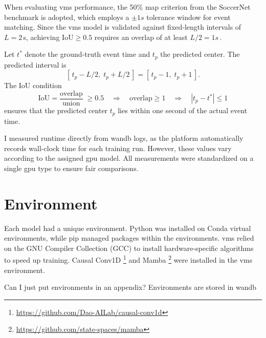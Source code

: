 When evaluating \acrshort{vms} performance, the 50\% \acrshort{map} criterion from the SoccerNet benchmark is adopted, which employs a $\pm1s$ tolerance window for event matching. Since the \acrshort{vms} model is validated against fixed‐length intervals of $L = 2\,$s, achieving $\mathrm{IoU}\ge0.5$ requires an overlap of at least $L/2 = 1s\,$.

Let $t^*$ denote the ground‐truth event time and $t_p$ the predicted center. The predicted interval is
\[
    [\,t_p - L/2,\;t_p + L/2\,]
    = [\,t_p - 1,\;t_p + 1\,].
\] 
The IoU condition
\[
    \mathrm{IoU}
    = \frac{\text{overlap}}{\text{union}}
    \;\ge0.5
    \quad\Longrightarrow\quad
    \text{overlap}\ge1
    \quad\Longrightarrow\quad
    |t_p - t^*|\le1
\]
ensures that the predicted center $t_p$ lies within one second of the actual event time.

I measured runtime directly from \acrshort{wandb} logs, as the platform automatically records wall-clock time for each training run. However, these values vary according to the assigned \acrshort{gpu} model. All measurements were standardized on a single \acrshort{gpu} type to ensure fair comparisons. 

\section{Environment} \todo 

Each model had a unique environment. Python was installed on Conda virtual environments, while pip managed packages within the environments. \acrshort{vms} relied on the GNU Compiler Collection (GCC) to install hardware-specific algorithms to speed up training. Causal Conv1D \footnote{\url{https://github.com/Dao-AILab/causal-conv1d}} and Mamba \footnote{\url{https://github.com/state-spaces/mamba}}  were installed in the \acrshort{vms} environment.

Can I just put environments in an appendix? Environments are stored in wandb